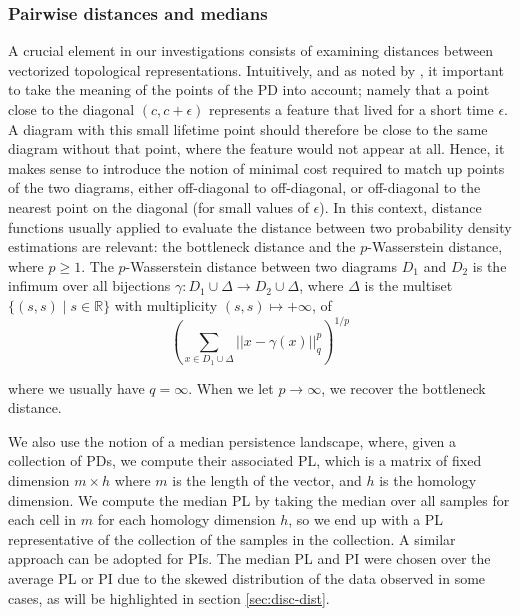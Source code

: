 \documentclass{article}
\begin{document}
\subsubsection{Pairwise distances and medians}

A crucial element in our investigations consists of examining distances between vectorized
topological representations. Intuitively, and as noted by
\citep{berwald2018computing}, it important to take the meaning of the points of the PD into account;
namely that a point close to the diagonal $(c,c+\epsilon)$ represents a feature that lived for a
short time $\epsilon$. A diagram with this small lifetime point should therefore be close to the
same diagram without that point, where the feature would not appear at all. Hence, it makes sense to
introduce the notion of minimal cost required to match up points of the two diagrams, either
off-diagonal to off-diagonal, or off-diagonal to the nearest point on the diagonal (for small values
of $\epsilon$). In this context, distance functions usually applied to evaluate the distance between
two probability density estimations are relevant: the bottleneck distance and the $p$-Wasserstein
distance, where $p\geq 1$. The $p$-Wasserstein distance between two diagrams $D_1$ and $D_2$ is the
infimum over all bijections $\gamma: D_1 \cup \Delta \to D_2 \cup \Delta$, where $\Delta$ is the
multiset $\lbrace (s, s) \mid s \in \mathbb{R} \rbrace$ with multiplicity $(s,s) \mapsto +\infty$,
of
\begin{equation}
  \label{eq:wasserstein_distance}
  \left(\sum_{x \in D_1 \cup \Delta} ||x - \gamma(x)||_q^p \right)^{1/p}
\end{equation}

where we usually have $q=\infty$. When we let $p\to\infty$, we recover the bottleneck distance.

We also use the notion of a median persistence landscape, where, given a collection of PDs, we
compute their associated PL, which is a matrix of fixed dimension $m\times h$ where $m$ is the
length of the vector, and $h$ is the homology dimension. We compute the median PL by taking the
median over all samples for each cell in $m$ for each homology dimension $h$, so we end up with a PL
representative of the collection of the samples in the collection. A similar approach can be adopted
for PIs. The median PL and PI were chosen over the average PL or PI due to the skewed distribution of
the data observed in some cases, as will be highlighted in section \ref{sec:disc-dist}. 
\end{document}
